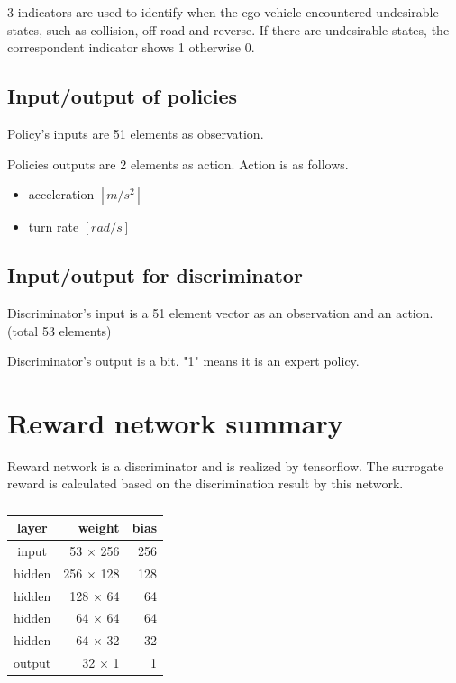 3 indicators are used to identify when the ego vehicle encountered undesirable states, such as collision, off-road and reverse.
If there are undesirable states, the correspondent  indicator shows 1 otherwise 0.





\subsection{Input/output of policies}

Policy's inputs are 51 elements as observation.

Policies outputs are 2 elements as action.
Action is as follows.

\begin{itemize}
\item acceleration $[m/s^2]$
\item turn rate $[rad/s]$
\end{itemize}


\subsection{Input/output for discriminator}

Discriminator's input is a 51 element vector as an observation and an action. (total 53 elements)

Discriminator's output is a bit. "1" means it is an expert policy.





\section{Reward network summary}

Reward network is a discriminator and is realized by tensorflow. The surrogate reward is calculated based on the discrimination result by this network.

\begin{table}[H]
\centering
\begin{tabular}{|c|r|r|}
\hline 
layer  & weight   & bias \\ \hline \hline
input  & 53 $\times$ 256 & 256  \\
hidden & 256 $\times$ 128 & 128 \\ 
hidden & 128 $\times$ 64 & 64 \\ 
hidden & 64 $\times$ 64 & 64 \\ 
hidden & 64 $\times$ 32 & 32 \\ 
output & 32 $\times$ 1 & 1 \\ 
\hline
\end{tabular} 
\caption{}
\label{tab:reward_network}
\end{table}


